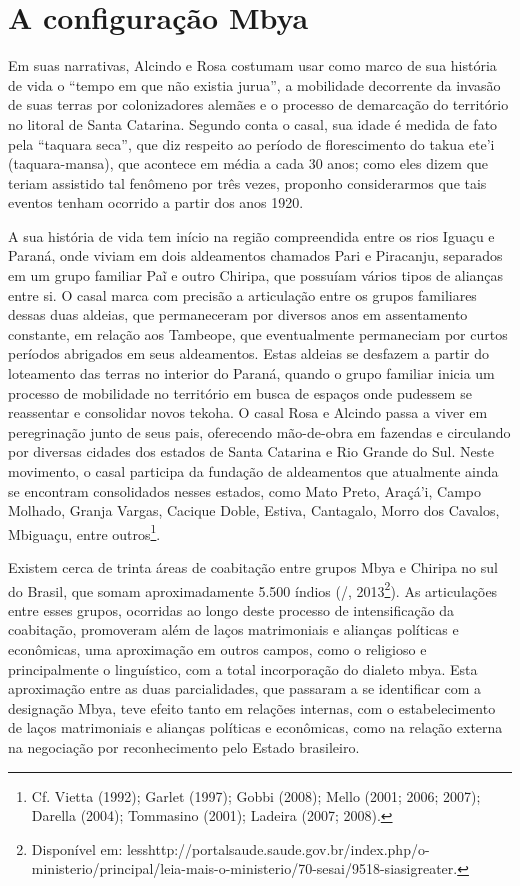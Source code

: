 \section{A configuração Mbya}

Em suas narrativas, Alcindo e Rosa costumam usar como marco de sua
história de vida o ``tempo em que não existia jurua'', a mobilidade
decorrente da invasão de suas terras por colonizadores alemães e o
processo de demarcação do território no litoral de Santa Catarina.
Segundo conta o casal, sua idade é medida de fato pela ``taquara seca'',
que diz respeito ao período de florescimento do takua ete’i
(taquara-mansa), que acontece em média a cada 30 anos; como eles dizem
que teriam assistido tal fenômeno por três vezes, proponho
considerarmos que tais eventos tenham ocorrido a partir dos anos 1920.

A sua história de vida tem início na região compreendida entre os rios
Iguaçu e Paraná, onde viviam em dois aldeamentos chamados Pari e
Piracanju, separados em um grupo familiar Paĩ e
outro Chiripa, que possuíam vários tipos de alianças entre si. O casal
marca com precisão a articulação entre os grupos familiares dessas duas
aldeias, que permaneceram por diversos anos em assentamento constante,
em relação aos Tambeope, que eventualmente permaneciam por curtos
períodos abrigados em seus aldeamentos. Estas aldeias se desfazem a
partir do loteamento das terras no interior do Paraná, quando o grupo
familiar inicia um processo de mobilidade no território em busca de
espaços onde pudessem se reassentar e consolidar novos tekoha. O casal
Rosa e Alcindo passa a viver em peregrinação junto de seus pais,
oferecendo mão-de-obra em fazendas e circulando por diversas cidades
dos estados de Santa Catarina e Rio Grande do Sul. Neste movimento, o
casal participa da fundação de aldeamentos que atualmente ainda se
encontram consolidados nesses estados, como Mato Preto, Araçá’i, Campo
Molhado, Granja Vargas, Cacique Doble, Estiva, Cantagalo, Morro dos
Cavalos, Mbiguaçu, entre outros\footnote{Cf. Vietta (1992); Garlet
(1997); Gobbi (2008); Mello (2001; 2006; 2007); Darella (2004);
Tommasino (2001); Ladeira (2007; 2008).}.

Existem cerca de trinta áreas de coabitação entre grupos Mbya e Chiripa
no sul do Brasil, que somam aproximadamente 5.500 índios (/,
2013\footnote{Disponível em:
{less}http://portalsaude.saude.gov.br/index.php/o-ministerio/principal/leia-mais-o-ministerio/70-sesai/9518-siasi{greater}.}).
As articulações entre esses grupos, ocorridas ao longo deste processo
de intensificação da coabitação, promoveram além de laços matrimoniais
e alianças políticas e econômicas, uma aproximação em outros campos,
como o religioso e principalmente o linguístico, com a total
incorporação do dialeto mbya. Esta aproximação entre as duas
parcialidades, que passaram a se identificar com a designação Mbya,
teve efeito tanto em relações internas, com o estabelecimento de laços
matrimoniais e alianças políticas e econômicas, como na relação externa
na negociação por reconhecimento pelo Estado brasileiro.

